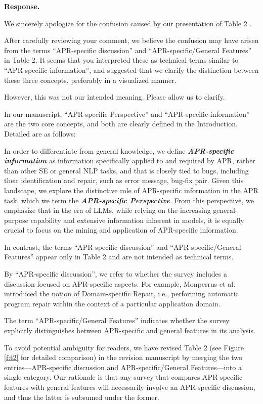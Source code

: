 \documentclass[acmsmall]{acmart}
\begin{document}
	\noindent
	\textbf{Response.}

	We sincerely apologize for the confusion caused by our presentation of
	\color{red}
	Table 2
	\color{black}
	.

	After carefully reviewing your comment, we believe the confusion may have arisen from the terms
	``APR-specific discussion'' and ``APR-specific/General Features'' in Table 2. It seems that you
	interpreted these as technical terms similar to ``APR-specific information'', and suggested that
	we clarify the distinction between these three concepts, preferably in a visualized manner.

	However, this was not our intended meaning. Please allow us to clarify.

	In our manuscript, ``APR-specific Perspective'' and ``APR-specific information'' are the two core
	concepts, and both are clearly defined in the Introduction. Detailed are as follows:

	\color{blue}
	In order to differentiate from general knowledge, we define \textbf{\textit{APR-specific
	information}} as information specifically applied to and required by APR, rather than other SE
	or general NLP tasks, and that is closely tied to bugs, including their identification and
	repair, such as error message, bug-fix pair. Given this landscape, we explore the distinctive
	role of APR-specific information in the APR task, which we term the \textbf{\textit{APR-specific
	Perspective}}. From this perspective, we emphasize that in the era of LLMs, while relying on the
	increasing general-purpose capability and extensive information inherent in models, it is
	equally crucial to focus on the mining and application of APR-specific information.
	\color{black}

	In contrast, the terms ``APR-specific discussion'' and ``APR-specific/General Features'' appear only
	in Table 2 and are not intended as technical terms.

	By ``APR-specific discussion'', we refer to whether the survey includes a discussion focused on
	APR-specific aspects. For example, Monperrus et al. \cite{S7} introduced the notion of Domain-specific
	Repair, i.e., performing automatic program repair within the context of a particular application
	domain.

	The term ``APR-specific/General Features'' indicates whether the survey explicitly distinguishes
	between APR-specific and general features in its analysis.

	To avoid potential ambiguity for readers, we have revised
	\color{red}
	Table 2
	\color{black}
	(see Figure \ref{f:t2} for detailed comparison) in the revision manuscript by merging the two entries—APR-specific
	discussion and APR-specific/General Features—into a single category. Our rationale is that any
	survey that compares APR-specific features with general features will necessarily involve an APR-specific
	discussion, and thus the latter is subsumed under the former.
\end{document}
